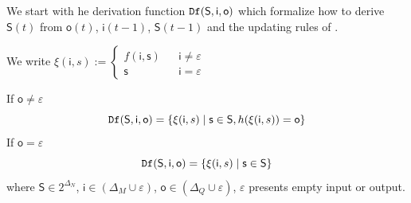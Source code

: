 We start with he derivation function $\Ded( \mathsf{S},  \mathsf{i},  \mathsf{o})$ which formalize how to derive $\mathsf{S}(t)$ from $\mathsf{o}(t)$, $\mathsf{i}(t-1)$, $\mathsf{S}(t-1)$ and the updating rules of \BCN.  %

We write $\xi(\mathsf{i}, s):= \left\{
\begin{array}{rcl}
f( \mathsf{i}, \mathsf{s})      &      & {\mathsf{i}\neq \varepsilon}\\
\mathsf{s}       &      & {\mathsf{i}= \varepsilon}
\end{array} \right. $

\begin{definition}[$\Ded( \mathsf{S},  \mathsf{i},  \mathsf{o})$] 
If $\mathsf{o}\neq \varepsilon$
\begin{equation*}
 {\tt Df}( \mathsf{S},  \mathsf{i},  \mathsf{o})=\{  \xi(\mathsf{i}, s ) \mid  \mathsf{s} \in \mathsf{S},  h(\xi(\mathsf{i}, s ))=\mathsf{o}\}
\end{equation*}
If $\mathsf{o}= \varepsilon$
\begin{equation*}
{\tt Df}( \mathsf{S},  \mathsf{i},  \mathsf{o})=\{  \xi(\mathsf{i}, s ) \mid  \mathsf{s} \in \mathsf{S}\}
\end{equation*}
where $\mathsf{S}\in 2^{\Delta_N}$, $\mathsf{i} \in (\Delta_M\cup\varepsilon)$, $\mathsf{o} \in (\Delta_Q\cup\varepsilon)$, $\varepsilon$ presents empty input or output.
\end{definition}

